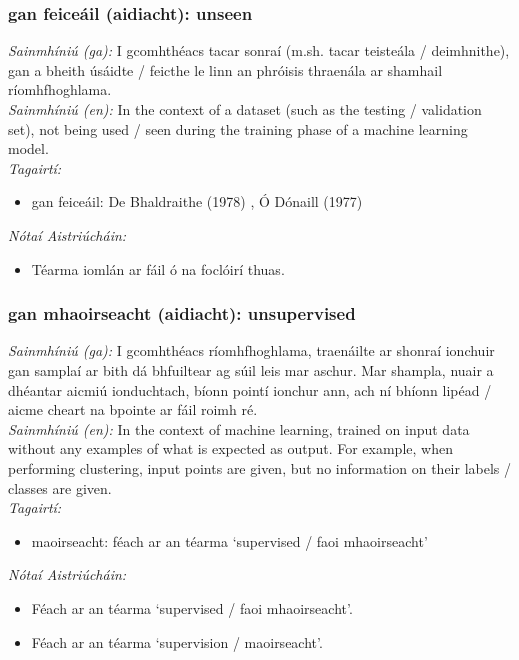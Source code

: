 \subsubsection*{gan feiceáil (aidiacht): unseen}
 \noindent \textit{Sainmhíniú (ga):} I gcomhthéacs tacar sonraí (m.sh. tacar teisteála / deimhnithe), gan a bheith úsáidte / feicthe le linn an phróisis thraenála ar shamhail ríomhfhoghlama.
\\
 \noindent \textit{Sainmhíniú (en):} In the context of a dataset (such as the testing / validation set), not being used / seen during the training phase of a machine learning model.
\\
 \noindent \textit{Tagairtí:}
\begin{itemize}
	\item gan feiceáil: De Bhaldraithe (1978) \cite{de-bhaldraithe}, Ó Dónaill (1977) \cite{odonaill}
\end{itemize}

 \noindent \textit{Nótaí Aistriúcháin:}
\begin{itemize}
	\item Téarma iomlán ar fáil ó na foclóirí thuas.
\end{itemize}


\subsubsection*{gan mhaoirseacht (aidiacht): unsupervised}
 \noindent \textit{Sainmhíniú (ga):} I gcomhthéacs ríomhfhoghlama, traenáilte ar shonraí ionchuir gan samplaí ar bith dá bhfuiltear ag súil leis mar aschur. Mar shampla, nuair a dhéantar aicmiú ionduchtach, bíonn pointí ionchur ann, ach ní bhíonn lipéad / aicme cheart na bpointe ar fáil roimh ré.
\\
 \noindent \textit{Sainmhíniú (en):} In the context of machine learning, trained on input data without any examples of what is expected as output. For example, when performing clustering, input points are given, but no information on their labels / classes are given.
\\
 \noindent \textit{Tagairtí:}
\begin{itemize}
	\item maoirseacht: féach ar an téarma `supervised / faoi mhaoirseacht'
\end{itemize}

 \noindent \textit{Nótaí Aistriúcháin:}
\begin{itemize}
	\item Féach ar an téarma `supervised / faoi mhaoirseacht'.
	\item Féach ar an téarma `supervision / maoirseacht'.
\end{itemize}



